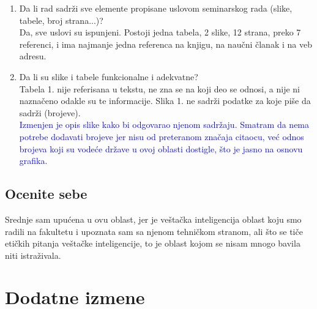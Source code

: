 \documentclass[a4paper]{report}
\newcommand{\odgovor}[1]{\textcolor{blue}{#1}}
\begin{document}
\begin{enumerate}
\item Da li rad sadrži sve elemente propisane uslovom seminarskog rada (slike, tabele, broj strana...)?\\
Da, sve uslovi su ispunjeni. Postoji jedna tabela, 2 slike, 12 strana, preko 7 referenci, i ima najmanje jedna referenca na knjigu, na naučni članak i na veb adresu.

\item Da li su slike i tabele funkcionalne i adekvatne?\\
Tabela 1. nije referisana u tekstu, ne zna se na koji deo se odnosi, a nije ni naznačeno odakle su te informacije. Slika 1. ne sadrži podatke za koje piše da sadrži (brojeve). \\
\odgovor{Izmenjen je opis slike kako bi odgovarao njenom sadržaju. Smatram da nema potrebe dodavati brojeve jer nisu od preteranom značaja citaocu, već odnos brojeva koji su vodeće države u ovoj oblasti dostigle, što je jasno na osnovu grafika. }

\end{enumerate}

\section{Ocenite sebe}
Srednje sam upućena u ovu oblast, jer je veštačka inteligencija oblast koju smo radili na fakultetu i upoznata sam sa njenom tehničkom stranom, ali što se tiče etičkih pitanja veštačke inteligencije, to je oblast kojom se nisam mnogo bavila niti istraživala. 


\chapter{Dodatne izmene}
\end{document}
